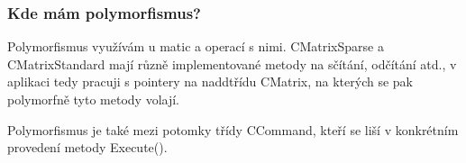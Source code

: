 \subsubsection*{Kde mám polymorfismus?}

Polymorfismus využívám u matic a operací s nimi. {\ttfamily C\+Matrix\+Sparse} a {\ttfamily C\+Matrix\+Standard} mají různě implementované metody na sčítání, odčítání atd., v aplikaci tedy pracuji s pointery na naddtřídu {\ttfamily C\+Matrix}, na kterých se pak polymorfně tyto metody volají.

Polymorfismus je také mezi potomky třídy {\ttfamily C\+Command}, kteří se liší v konkrétním provedení metody {\ttfamily Execute()}. 